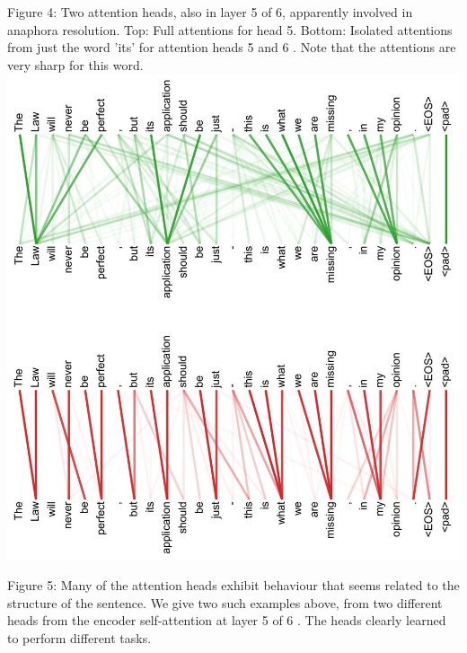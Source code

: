 \documentclass[10pt]{article}
\begin{document}
Figure 4: Two attention heads, also in layer 5 of 6, apparently involved in anaphora resolution. Top: Full attentions for head 5. Bottom: Isolated attentions from just the word 'its' for attention heads 5 and 6 . Note that the attentions are very sharp for this word.\\
\includegraphics[max width=\textwidth, center]{2024_11_26_7ad1d7977194ba7a884dg-15}

Figure 5: Many of the attention heads exhibit behaviour that seems related to the structure of the sentence. We give two such examples above, from two different heads from the encoder self-attention at layer 5 of 6 . The heads clearly learned to perform different tasks.
\end{document}
